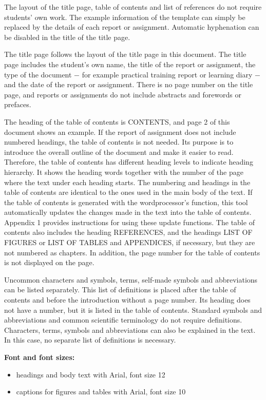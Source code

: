 \documentclass[12pt]{article}
\begin{document}
The layout of the title page, table of contents and list of references do not require students’ own work. The example information of the template can simply be replaced by the details of each report or assignment. Automatic hyphenation can be disabled in the title of the title page.

The title page follows the layout of the title page in this document. The title page includes the student’s own name, the title of the report or assignment, the type of the document − for example practical training report or learning diary − and the date of the report or assignment. There is no page number on the title page, and reports or assignments 
do not include abstracts and forewords or prefaces. 

The heading of the table of contents is CONTENTS, and page 2 of this document shows an example. If the report of assignment does not include numbered headings, the table of contents is not needed. Its purpose is to introduce the overall outline of the document and make it easier to read. Therefore, the table of contents has different heading levels to indicate heading hierarchy. It shows the heading words together with the number of the page where the text under each heading starts. The numbering and headings in the table of contents are identical to the ones used in the main body of the text. If the table of contents is generated with the wordprocessor’s function, this tool automatically updates the changes made in the text into the table of contents. Appendix 1 provides instructions for using these update functions. The table of contents also includes the heading REFERENCES, and the headings LIST OF FIGURES or LIST OF TABLES and APPENDICES, if necessary, but they are not numbered as chapters. In addition, the page number for the table of contents is not displayed on the page.

Uncommon characters and symbols, terms, self-made symbols and abbreviations can be listed separately. This list of definitions is placed after the table of contents and before the introduction without a page number. Its heading does not have a number, but it is listed in the table of contents. Standard symbols and abbreviations and common scientific terminology do not require definitions. Characters, terms, symbols and abbreviations can also be explained in the text. In this case, no separate list of definitions is necessary.


\textbf{Font and font sizes:}

\begin{itemize}
	\item{headings and body text with Arial, font size 12}
	\item{captions for figures and tables with Arial, font size 10}
\end{itemize}
\end{document}
